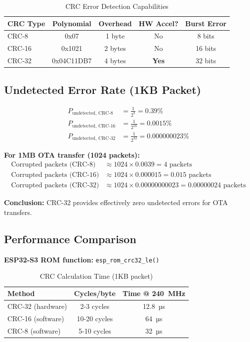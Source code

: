 \begin{table}[H]
\centering
\caption{CRC Error Detection Capabilities}
\begin{tabular}{lcccc}
\toprule
\textbf{CRC Type} & \textbf{Polynomial} & \textbf{Overhead} & \textbf{HW Accel?} & \textbf{Burst Error} \\
\midrule
CRC-8 & 0x07 & 1 byte & No & 8 bits \\
CRC-16 & 0x1021 & 2 bytes & No & 16 bits \\
CRC-32 & 0x04C11DB7 & 4 bytes & \textbf{Yes} & 32 bits \\
\bottomrule
\end{tabular}
\end{table}

\subsection{Undetected Error Rate (1KB Packet)}

\begin{align}
P_{\text{undetected, CRC-8}} &= \frac{1}{2^8} = 0.39\% \\
P_{\text{undetected, CRC-16}} &= \frac{1}{2^{16}} = 0.0015\% \\
P_{\text{undetected, CRC-32}} &= \frac{1}{2^{32}} = 0.000000023\%
\end{align}

\textbf{For 1MB OTA transfer (1024 packets):}
\begin{align}
\text{Corrupted packets (CRC-8)} &\approx 1024 \times 0.0039 = 4 \text{ packets} \\
\text{Corrupted packets (CRC-16)} &\approx 1024 \times 0.000015 = 0.015 \text{ packets} \\
\text{Corrupted packets (CRC-32)} &\approx 1024 \times 0.00000000023 = 0.00000024 \text{ packets}
\end{align}

\textbf{Conclusion:} CRC-32 provides effectively zero undetected errors for OTA transfers.

\subsection{Performance Comparison}

\textbf{ESP32-S3 ROM function:} \texttt{esp\_rom\_crc32\_le()}

\begin{table}[H]
\centering
\caption{CRC Calculation Time (1KB packet)}
\begin{tabular}{lcc}
\toprule
\textbf{Method} & \textbf{Cycles/byte} & \textbf{Time @ 240~MHz} \\
\midrule
CRC-32 (hardware) & 2-3 cycles & 12.8~µs \\
CRC-16 (software) & 10-20 cycles & 64~µs \\
CRC-8 (software) & 5-10 cycles & 32~µs \\
\bottomrule
\end{tabular}
\end{table}

